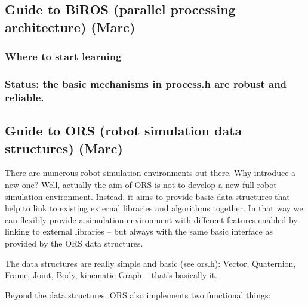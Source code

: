 \subsection{Guide to BiROS (parallel processing architecture)
(Marc)}\label{Guide to BiROS}


\subsubsection{Where to start learning}


\subsubsection{Status: the basic mechanisms in process.h are robust and reliable. }

\subsection{Guide to ORS (robot simulation data structures) (Marc)}

There are numerous robot simulation environments out there. Why
introduce a new one? Well, actually the aim of ORS is not to develop a
new full robot simulation environment. Instead, it aims to provide
basic data structures that help to link to existing external libraries
and algorithms together. In that way we can flexibly provide a
simulation environment with different features enabled by linking to
external libraries -- but always with the same basic interface as
provided by the ORS data structures.

The data structures are really simple and basic (see ors.h): Vector, Quaternion, Frame, Joint, Body, kinematic Graph -- that's basically it.

Beyond the data structures, ORS also implements two functional things:

